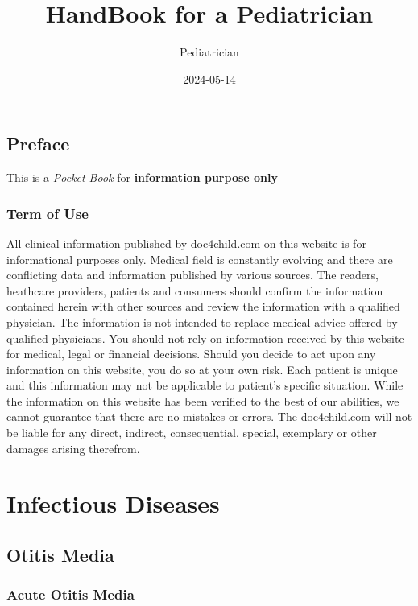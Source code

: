 \documentclass[
]{book}
\title{HandBook for a Pediatrician}
\author{Pediatrician}
\date{2024-05-14}
\begin{document}
\maketitle

{
\setcounter{tocdepth}{1}
\tableofcontents
}
\chapter*{Preface}\label{preface}

This is a \emph{Pocket Book} for \textbf{information purpose only}

\section*{Term of Use}\label{term-of-use}

All clinical information published by doc4child.com on this website is for informational purposes only. Medical field is constantly evolving and there are conflicting data and information published by various sources. The readers, heathcare providers, patients and consumers should confirm the information contained herein with other sources and review the information with a qualified physician. The information is not intended to replace medical advice offered by qualified physicians. You should not rely on information received by this website for medical, legal or financial decisions. Should you decide to act upon any information on this website, you do so at your own risk. Each patient is unique and this information may not be applicable to patient's specific situation. While the information on this website has been verified to the best of our abilities, we cannot guarantee that there are no mistakes or errors. The doc4child.com will not be liable for any direct, indirect, consequential, special, exemplary or other damages arising therefrom.

\part{Infectious Diseases}\label{part-infectious-diseases}

\chapter{Otitis Media}\label{OM}

\section{Acute Otitis Media}\label{AOM}
\end{document}
